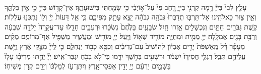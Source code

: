 \documentclass[twoside, openany, parskip=half, 11pt]{book}
\begin{document}
\\
עָלַ֤ץ לִבִּי֙ בַּייָ֔ רָ֥מָה קַרְנִ֖י בַּייָ֑ רָ֤חַב פִּי֙ עַל־א֣וֹיְבַ֔י כִּ֥י שָׂמַ֖חְתִּי בִּישׁוּעָתֶֽךָ׃ אֵין־קָד֥וֹשׁ כַּייָ֖ כִּ֣י אֵ֣ין בִּלְתֶּ֑ךָ וְאֵ֥ין צ֖וּר כֵּאלֹהֵֽינוּ׃ אַל־תַּרְבּ֤וּ תְדַבְּרוּ֙ גְּבֹהָ֣ה גְבֹהָ֔ה יֵצֵ֥א עָתָ֖ק מִפִּיכֶ֑ם כִּ֣י אֵ֤ל דֵּעוֹת֙ יְיָ֔ וְל֥וֹ נִתְכְּנ֖וּ עֲלִלֽוֹת׃ קֶ֥שֶׁת גִּבֹּרִ֖ים חַתִּ֑ים וְנִכְשָׁלִ֖ים אָ֥זְרוּ חָֽיִל׃ שְׂבֵעִ֤ים בַּלֶּ֙חֶם֙ נִשְׂכָּ֔רוּ וּרְעֵבִ֖ים חָדֵ֑לּוּ עַד־עֲקָרָה֙ יָלְדָ֣ה שִׁבְעָ֔ה וְרַבַּ֥ת בָּנִ֖ים אֻמְלָֽלָה׃ יְיָ֖ מֵמִ֣ית וּמְחַיֶּ֑ה מוֹרִ֥יד שְׁא֖וֹל וַיָּֽעַל׃ יְיָ֖ מוֹרִ֣ישׁ וּמַעֲשִׁ֑יר מַשְׁפִּ֖יל אַף־מְרוֹמֵֽם׃ מֵקִ֨ים מֵעָפָ֜ר דָּ֗ל מֵֽאַשְׁפֹּת֙ יָרִ֣ים אֶבְי֔וֹן לְהוֹשִׁיב֙ עִם־נְדִיבִ֔ים וְכִסֵּ֥א כָב֖וֹד יַנְחִלֵ֑ם כִּ֤י לַֽייָ֙ מְצֻ֣קֵי אֶ֔רֶץ וַיָּ֥שֶׁת עֲלֵיהֶ֖ם תֵּבֵֽל׃ רַגְלֵ֤י חֲסִידָו֙ יִשְׁמֹ֔ר וּרְשָׁעִ֖ים בַּחֹ֣שֶׁךְ יִדָּ֑מּוּ כִּי־לֹ֥א בְכֹ֖חַ יִגְבַּר־אִֽישׁ׃ יְיָ֞ יֵחַ֣תּוּ מְרִיבָ֗ו עָלָו֙ בַּשָּׁמַ֣יִם יַרְעֵ֔ם יְיָ֖ יָדִ֣ין אַפְסֵי־אָ֑רֶץ וְיִתֶּן־עֹ֣ז לְמַלְכּ֔וֹ וְיָרֵ֖ם קֶ֥רֶן מְשִׁיחֽוֹ׃
\end{document}
